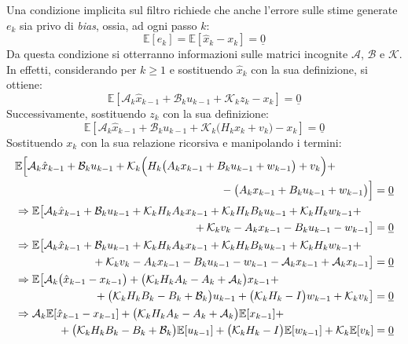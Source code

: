 \documentclass[12pt,a4paper,openright,twoside]{book}
\begin{document}
Una condizione implicita sul filtro richiede che anche l'errore sulle stime generate $e_k$ sia privo di \textit{bias}, ossia, ad ogni passo $k$:
$$\mathbb{E}[e_k]=\mathbb{E}[\hat{x}_k-x_k]=\underline{0}$$
Da questa condizione si otterranno informazioni sulle matrici incognite $\mathcal{A}$, $\mathcal{B}$ e $\mathcal{K}$. In effetti, considerando per $k\geq 1$ e sostituendo $\hat{x}_k$ con la sua definizione, si ottiene:
$$\mathbb{E}[\mathcal{A}_k\hat{x}_{k-1}+\mathcal{B}_ku_{k-1}+\mathcal{K}_kz_k-x_k]=\underline{0}$$
Successivamente, sostituendo $z_k$ con la sua definizione:
$$\mathbb{E}\left[\mathcal{A}_k\hat{x}_{k-1}+\mathcal{B}_ku_{k-1}+\mathcal{K}_k\bigl(H_kx_k+v_k\bigr)-x_k\right]=\underline{0}$$
Sostituendo $x_k$ con la sua relazione ricorsiva e manipolando i termini:
\begin{gather*}
\begin{multlined}[\textwidth]
\mathbb{E}\Bigl[\mathcal{A}_k\hat{x}_{k-1}+\mathcal{B}_ku_{k-1}+\mathcal{K}_k\Bigl(H_k\bigl(A_kx_{k-1}+B_ku_{k-1}+w_{k-1}\bigr)+v_k\Bigr)+ \\
-\bigl(A_kx_{k-1}+B_ku_{k-1}+w_{k-1}\bigr)\Bigr]=\underline{0}
\end{multlined} \\
\begin{multlined}[\textwidth]
\Rightarrow\mathbb{E}\bigl[\mathcal{A}_k\hat{x}_{k-1}+\mathcal{B}_ku_{k-1}+\mathcal{K}_kH_kA_kx_{k-1}+\mathcal{K}_kH_kB_ku_{k-1}+\mathcal{K}_kH_kw_{k-1}+ \\
+\mathcal{K}_kv_k-A_kx_{k-1}-B_ku_{k-1}-w_{k-1}\bigr]=\underline{0}
\end{multlined} \\
\begin{multlined}[\textwidth]
\Rightarrow\mathbb{E}\bigl[\mathcal{A}_k\hat{x}_{k-1}+\mathcal{B}_ku_{k-1}+\mathcal{K}_kH_kA_kx_{k-1}+\mathcal{K}_kH_kB_ku_{k-1}+\mathcal{K}_kH_kw_{k-1}+ \\
+\mathcal{K}_kv_k-A_kx_{k-1}-B_ku_{k-1}-w_{k-1}-\mathcal{A}_kx_{k-1}+\mathcal{A}_kx_{k-1}\bigr]=\underline{0}
\end{multlined} \\
\begin{multlined}[\textwidth]
\Rightarrow\mathbb{E}\bigl[\mathcal{A}_k\bigl(\hat{x}_{k-1}-x_{k-1}\bigr)+\bigl(\mathcal{K}_kH_kA_k-A_k+\mathcal{A}_k\bigr)x_{k-1}+ \\
+\bigl(\mathcal{K}_kH_kB_k-B_k+\mathcal{B}_k\bigr)u_{k-1}+\bigl(\mathcal{K}_kH_k-I\bigr)w_{k-1}+\mathcal{K}_kv_k\bigr]=\underline{0}
\end{multlined} \\
\begin{multlined}[\textwidth]
\Rightarrow\mathcal{A}_k\mathbb{E}[\hat{x}_{k-1}-x_{k-1}]+\bigl(\mathcal{K}_kH_kA_k-A_k+\mathcal{A}_k\bigr)\mathbb{E}[x_{k-1}]+ \\
+\bigl(\mathcal{K}_kH_kB_k-B_k+\mathcal{B}_k\bigr)\mathbb{E}[u_{k-1}]+\bigl(\mathcal{K}_kH_k-I\bigr)\mathbb{E}[w_{k-1}]+\mathcal{K}_k\mathbb{E}[v_k]=\underline{0}
\end{multlined}
\end{gather*}
\end{document}
